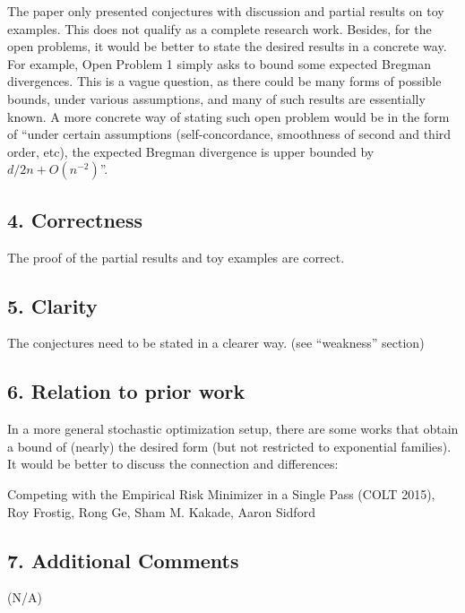 The paper only presented conjectures with discussion and partial results on toy examples. This does not qualify as a complete research work. Besides, for the open problems, it would be better to state the desired results in a concrete way. For example, Open Problem 1 simply asks to bound some expected Bregman divergences. This is a vague question, as there could be many forms of possible bounds, under various assumptions, and many of such results are essentially known. A more concrete way of stating such open problem would be in the form of ``under certain assumptions (self-concordance, smoothness of second and third order, etc), the expected Bregman divergence is upper bounded by $d / 2n + O (n^{-2})$''.


\subsection*{4. Correctness}

The proof of the partial results and toy examples are correct.

\subsection*{5. Clarity}

The conjectures need to be stated in a clearer way. (see ``weakness'' section)

\subsection*{6. Relation to prior work}

In a more general stochastic optimization setup, there are some works that obtain a bound of (nearly) the desired form (but not restricted to exponential families). It would be better to discuss the connection and differences:

Competing with the Empirical Risk Minimizer in a Single Pass (COLT 2015), Roy Frostig, Rong Ge, Sham M. Kakade, Aaron Sidford

\subsection*{7. Additional Comments}

(N/A)





























